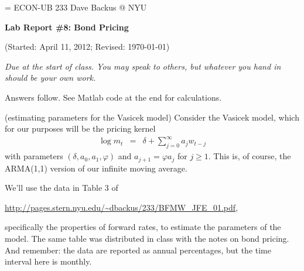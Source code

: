 \documentclass[11pt]{exam}
\begin{document}
\parskip=\bigskipamount
\parindent=0.0in
\thispagestyle{empty}
{\large ECON-UB 233 \hfill Dave Backus @ NYU}

\bigskip\bigskip
\centerline{\Large \bf Lab Report \#8:  Bond Pricing}
\centerline{(Started: April 11, 2012; Revised: \today)}

\bigskip
{\it Due at the start of class.
You may speak to others, but whatever you hand in should be your own work.}

\begin{questions}

\begin{solution}
Answers follow.  See Matlab code at the end for calculations.
\end{solution}

\question (estimating parameters for the Vasicek model)
Consider the Vasicek model, which for our purposes will
be the pricing kernel
\begin{eqnarray*}
    \log m_t &=& \delta + \sum_{j=0}^\infty a_j w_{t-j}
\end{eqnarray*}
with parameters $(\delta, a_0, a_1, \varphi)$
and $a_{j+1} = \varphi a_j$ for $j\geq 1$.
This is, of course, the ARMA(1,1) version of our infinite moving average.

We'll use the data in Table 3 of

\url{http://pages.stern.nyu.edu/~dbackus/233/BFMW_JFE_01.pdf},

specifically the properties of forward rates,
to estimate the parameters of the model.
The same table was distributed in class with the notes on
bond pricing.
And remember:  the data are reported as annual percentages,
but the time interval here is monthly.

%
\end{questions}
\end{document}
